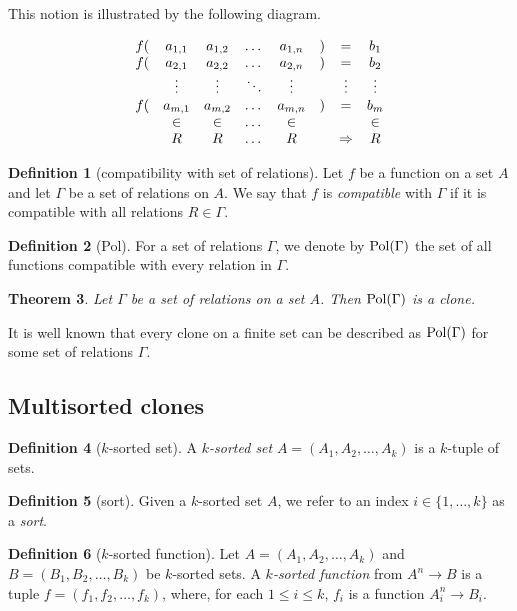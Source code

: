 \documentclass{amsart}
\numberwithin{equation}{section}
\theoremstyle{plain}
\newtheorem{theorem}{Theorem}[section]
\theoremstyle{definition}
\newtheorem{definition}[theorem]{Definition}
\def\set#1{#1}
\def\relation#1{#1}
\def\Pol{{\rm Pol}}
\begin{document}
This notion is illustrated by the following diagram.

$$\begin{matrix}
f(& a_{1,1} & a_{1,2} & \dots & a_{1,n} & ) & = & b_1 \cr
f(& a_{2,1} & a_{2,2} & \dots & a_{2,n} & ) & = & b_2 \cr
& \vdots & \vdots & \ddots & \vdots &  & \vdots & \vdots \cr
f(& a_{m,1} & a_{m,2} & \dots & a_{m,n} & ) & = & b_m \cr
& \in & \in & \dots & \in &  &  & \in \cr
& R & R & \dots & R &  & \Rightarrow & R \cr
\end{matrix}$$


\begin{definition}[compatibility with set of relations]
Let $f$ be a function on a set $\set{A}$ and let $\Gamma$ be a set of relations on $\set{A}$. We say that $f$ is {\it compatible} with $\Gamma$ if it is compatible with all relations $\relation{R}\in\Gamma$.
\end{definition}

\begin{definition}[Pol]
For a set of relations $\Gamma$, we denote by $\Pol(\Gamma)$ the set of all functions compatible with every relation in $\Gamma$.
\end{definition}

\begin{theorem}
\cite{bergman} Let $\Gamma$ be a set of relations on a set $\set{A}$. Then $\Pol(\Gamma)$ is a clone.
\end{theorem}


It is well known \cite{bodnarchuk,geiger} that every clone on a finite set can be described as $\Pol(\Gamma)$ for some set of relations $\Gamma$.  

\subsection{Multisorted clones}

\begin{definition}[$k$-sorted set]
A {\it $k$-sorted set} $\set{A}=(\set{A}_1,\set{A}_2,\dots,\set{A}_k)$ is a $k$-tuple of sets.
\end{definition}

\begin{definition}[sort]
Given a $k$-sorted set $\set{A}$, we refer to an index $i\in\{1,\dots,k\}$ as a \emph{sort}.
\end{definition}

\begin{definition}[$k$-sorted function]
Let $\set{A}=(\set{A}_1,\set{A}_2,\dots,\set{A}_k)$ and $\set{B}=(\set{B}_1,\set{B}_2,\dots,\set{B}_k)$ be $k$-sorted sets. A {\em $k$-sorted function} from $\set{A}^n \to \set{B}$ is a tuple $f=(f_1,f_2,\dots,f_k)$, where, for each $1\leq i\leq k$, $f_i$ is a function $\set{A}_i^n\to \set{B}_i$.
\end{definition}
\end{document}

